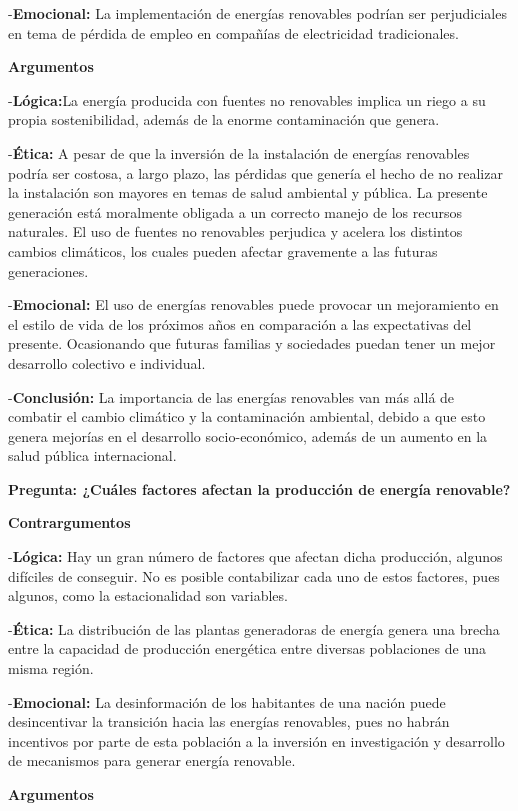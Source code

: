 \documentclass[
  letterpaper,
  DIV=11,
  numbers=noendperiod]{scrreprt}
\begin{document}
-\textbf{Emocional:} La implementación de energías renovables podrían
ser perjudiciales en tema de pérdida de empleo en compañías de
electricidad tradicionales.

\textbf{Argumentos}

-\textbf{Lógica:}La energía producida con fuentes no renovables implica
un riego a su propia sostenibilidad, además de la enorme contaminación
que genera.

-\textbf{Ética:} A pesar de que la inversión de la instalación de
energías renovables podría ser costosa, a largo plazo, las pérdidas que
genería el hecho de no realizar la instalación son mayores en temas de
salud ambiental y pública. La presente generación está moralmente
obligada a un correcto manejo de los recursos naturales. El uso de
fuentes no renovables perjudica y acelera los distintos cambios
climáticos, los cuales pueden afectar gravemente a las futuras
generaciones.

-\textbf{Emocional:} El uso de energías renovables puede provocar un
mejoramiento en el estilo de vida de los próximos años en comparación a
las expectativas del presente. Ocasionando que futuras familias y
sociedades puedan tener un mejor desarrollo colectivo e individual.

-\textbf{Conclusión:} La importancia de las energías renovables van más
allá de combatir el cambio climático y la contaminación ambiental,
debido a que esto genera mejorías en el desarrollo socio-económico,
además de un aumento en la salud pública internacional.

\textbf{Pregunta: ¿Cuáles factores afectan la producción de energía
renovable?}

\textbf{Contrargumentos}

-\textbf{Lógica:} Hay un gran número de factores que afectan dicha
producción, algunos difíciles de conseguir. No es posible contabilizar
cada uno de estos factores, pues algunos, como la estacionalidad son
variables.

-\textbf{Ética:} La distribución de las plantas generadoras de energía
genera una brecha entre la capacidad de producción energética entre
diversas poblaciones de una misma región.

-\textbf{Emocional:} La desinformación de los habitantes de una nación
puede desincentivar la transición hacia las energías renovables, pues no
habrán incentivos por parte de esta población a la inversión en
investigación y desarrollo de mecanismos para generar energía renovable.

\textbf{Argumentos}
\end{document}
